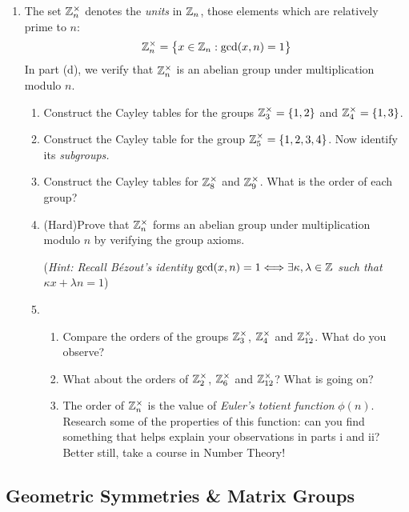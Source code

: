 \begin{exercises}
\begin{enumerate}
	  \item\label{exs:znunits} The set $\mathbb{Z}_n^\times$ denotes the \emph{units} in $\mathbb{Z}_n$, those elements which are relatively prime to $n$:
	  \[
	  	\mathbb{Z}_n^\times=\bigl\{x\in\mathbb{Z}_n:\gcd(x,n)=1\bigr\}
	  \]
	  In part (d), we verify that $\mathbb{Z}_n^\times$ is an abelian group under multiplication modulo $n$.
	  \begin{enumerate}
	    \item Construct the Cayley tables for the groups $\mathbb{Z}_3^\times=\{1,2\}$ and $\mathbb{Z}_4^\times=\{1,3\}$.
	    \item\label{exs:z5times} Construct the Cayley table for the group $\mathbb{Z}_5^\times=\{1,2,3,4\}$. Now identify its \emph{subgroups.} 
	    \item\label{exs:znunits89} Construct the Cayley tables for $\mathbb{Z}_8^\times$ and $\mathbb{Z}_9^\times$. What is the order of each group?
	    \item (Hard)\lstsp Prove that $\mathbb{Z}_n^\times$ forms an abelian group under multiplication modulo $n$ by verifying the group axioms.\par
	    (\emph{Hint: Recall Bézout's identity $\gcd(x,n)=1\Longleftrightarrow\exists\kappa,\lambda\in\mathbb{Z}$ such that $\kappa x+\lambda n=1$})
	    \item\begin{enumerate}
	      \item Compare the orders of the groups $\mathbb{Z}_3^\times$, $\mathbb{Z}_4^\times$ and $\mathbb{Z}_{12}^\times$. What do you observe?
	      \item What about the orders of $\mathbb{Z}_2^\times$, $\mathbb{Z}_6^\times$ and $\mathbb{Z}_{12}^\times$? What is going on?
	      \item The order of $\mathbb{Z}_n^\times$ is the value of \emph{Euler's totient function} $\phi(n)$. Research some of the properties of this function: can you find something that helps explain your observations in parts i and ii? Better still, take a course in Number Theory!
	  	\end{enumerate}
	  	
	  \end{enumerate}
	    
	\end{enumerate}
\end{exercises}


\clearpage


\subsection{Geometric Symmetries \& Matrix Groups}\label{sec:geomgroups}

